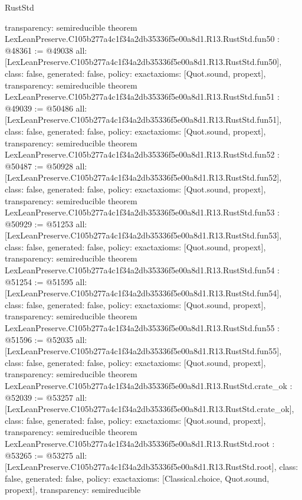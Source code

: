 \begin{lexlean}{RustStd}
\begin{coremodule}
{  transparency: semireducible
}
theorem LexLeanPreserve.C105b277a4c1f34a2db35336f5e00a8d1.R13.RustStd.fun50 : @48361 := @49038 {
  all: [LexLeanPreserve.C105b277a4c1f34a2db35336f5e00a8d1.R13.RustStd.fun50],
  class: false,
  generated: false,
  policy: exact{axioms: [Quot.sound, propext]},
  transparency: semireducible
}
theorem LexLeanPreserve.C105b277a4c1f34a2db35336f5e00a8d1.R13.RustStd.fun51 : @49039 := @50486 {
  all: [LexLeanPreserve.C105b277a4c1f34a2db35336f5e00a8d1.R13.RustStd.fun51],
  class: false,
  generated: false,
  policy: exact{axioms: [Quot.sound, propext]},
  transparency: semireducible
}
theorem LexLeanPreserve.C105b277a4c1f34a2db35336f5e00a8d1.R13.RustStd.fun52 : @50487 := @50928 {
  all: [LexLeanPreserve.C105b277a4c1f34a2db35336f5e00a8d1.R13.RustStd.fun52],
  class: false,
  generated: false,
  policy: exact{axioms: [Quot.sound, propext]},
  transparency: semireducible
}
theorem LexLeanPreserve.C105b277a4c1f34a2db35336f5e00a8d1.R13.RustStd.fun53 : @50929 := @51253 {
  all: [LexLeanPreserve.C105b277a4c1f34a2db35336f5e00a8d1.R13.RustStd.fun53],
  class: false,
  generated: false,
  policy: exact{axioms: [Quot.sound, propext]},
  transparency: semireducible
}
theorem LexLeanPreserve.C105b277a4c1f34a2db35336f5e00a8d1.R13.RustStd.fun54 : @51254 := @51595 {
  all: [LexLeanPreserve.C105b277a4c1f34a2db35336f5e00a8d1.R13.RustStd.fun54],
  class: false,
  generated: false,
  policy: exact{axioms: [Quot.sound, propext]},
  transparency: semireducible
}
theorem LexLeanPreserve.C105b277a4c1f34a2db35336f5e00a8d1.R13.RustStd.fun55 : @51596 := @52035 {
  all: [LexLeanPreserve.C105b277a4c1f34a2db35336f5e00a8d1.R13.RustStd.fun55],
  class: false,
  generated: false,
  policy: exact{axioms: [Quot.sound, propext]},
  transparency: semireducible
}
theorem LexLeanPreserve.C105b277a4c1f34a2db35336f5e00a8d1.R13.RustStd.crate_ok : @52039 := @53257 {
  all: [LexLeanPreserve.C105b277a4c1f34a2db35336f5e00a8d1.R13.RustStd.crate_ok],
  class: false,
  generated: false,
  policy: exact{axioms: [Quot.sound, propext]},
  transparency: semireducible
}
theorem LexLeanPreserve.C105b277a4c1f34a2db35336f5e00a8d1.R13.RustStd.root : @53265 := @53275 {
  all: [LexLeanPreserve.C105b277a4c1f34a2db35336f5e00a8d1.R13.RustStd.root],
  class: false,
  generated: false,
  policy: exact{axioms: [Classical.choice, Quot.sound, propext]},
  transparency: semireducible
}


\end{coremodule}
\end{lexlean}
